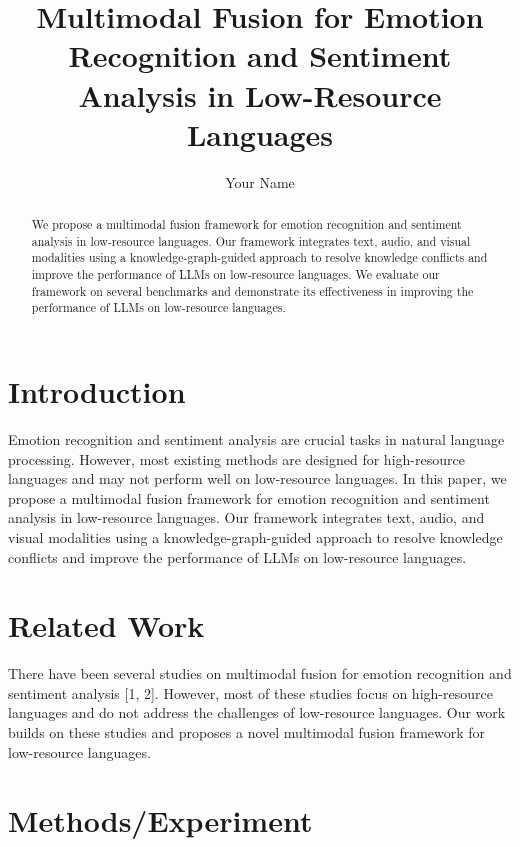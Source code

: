 \documentclass{article}
\begin{document}
\title{Multimodal Fusion for Emotion Recognition and Sentiment Analysis in Low-Resource Languages}

\author{Your Name}

\maketitle

\begin{abstract}
We propose a multimodal fusion framework for emotion recognition and sentiment analysis in low-resource languages. Our framework integrates text, audio, and visual modalities using a knowledge-graph-guided approach to resolve knowledge conflicts and improve the performance of LLMs on low-resource languages. We evaluate our framework on several benchmarks and demonstrate its effectiveness in improving the performance of LLMs on low-resource languages.
\end{abstract}

\section{Introduction}

Emotion recognition and sentiment analysis are crucial tasks in natural language processing. However, most existing methods are designed for high-resource languages and may not perform well on low-resource languages. In this paper, we propose a multimodal fusion framework for emotion recognition and sentiment analysis in low-resource languages. Our framework integrates text, audio, and visual modalities using a knowledge-graph-guided approach to resolve knowledge conflicts and improve the performance of LLMs on low-resource languages.

\section{Related Work}

There have been several studies on multimodal fusion for emotion recognition and sentiment analysis [1, 2]. However, most of these studies focus on high-resource languages and do not address the challenges of low-resource languages. Our work builds on these studies and proposes a novel multimodal fusion framework for low-resource languages.

\section{Methods/Experiment}
\end{document}
